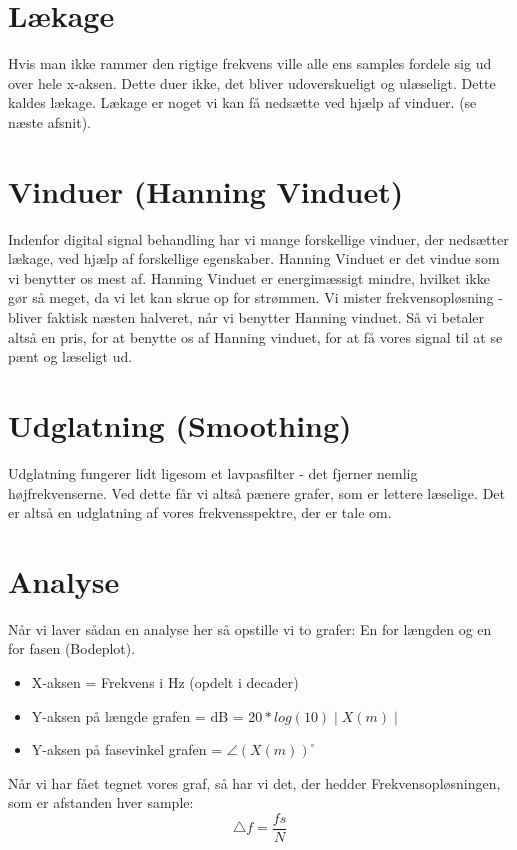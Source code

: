\documentclass[12pt, letterpaper]{article}
\begin{document}
\section{Lækage}
Hvis man ikke rammer den rigtige frekvens ville alle ens samples fordele sig ud over hele x-aksen. Dette duer ikke, det bliver udoverskueligt og ulæseligt. Dette kaldes lækage. Lækage er noget vi kan få nedsætte ved hjælp af vinduer. (se næste afsnit). 

\section{Vinduer (Hanning Vinduet)}
Indenfor digital signal behandling har vi mange forskellige vinduer, der nedsætter lækage, ved hjælp af forskellige egenskaber. 
Hanning Vinduet er det vindue som vi benytter os mest af. 
Hanning Vinduet er energimæssigt mindre, hvilket ikke gør så meget, da vi let kan skrue op for strømmen. 
Vi mister frekvensopløsning - bliver faktisk næsten halveret, når vi benytter Hanning vinduet. Så vi betaler altså en pris, for at benytte os af Hanning vinduet, for at få vores signal til at se pænt og læseligt ud. 

\section{Udglatning (Smoothing)}
Udglatning fungerer lidt ligesom et lavpasfilter - det fjerner nemlig højfrekvenserne. 
Ved dette får vi altså pænere grafer, som er lettere læselige. Det er altså en udglatning af vores frekvensspektre, der er tale om. 

\section{Analyse}

Når vi laver sådan en analyse her så opstille vi to grafer: 
En for længden og en for fasen (Bodeplot). \\

\begin{itemize}
\item X-aksen = Frekvens i Hz (opdelt i decader)
\item Y-aksen på længde grafen = dB = $ 20*log(10)\mid X(m) \mid$ 
\item Y-aksen på fasevinkel grafen = $\angle (X(m))^{\circ}  $
\end{itemize}

Når vi har fået tegnet vores graf, så har vi det, der hedder Frekvensopløsningen, som er afstanden hver sample: 
$$\bigtriangleup f = \frac{fs}{N} $$
\end{document}
